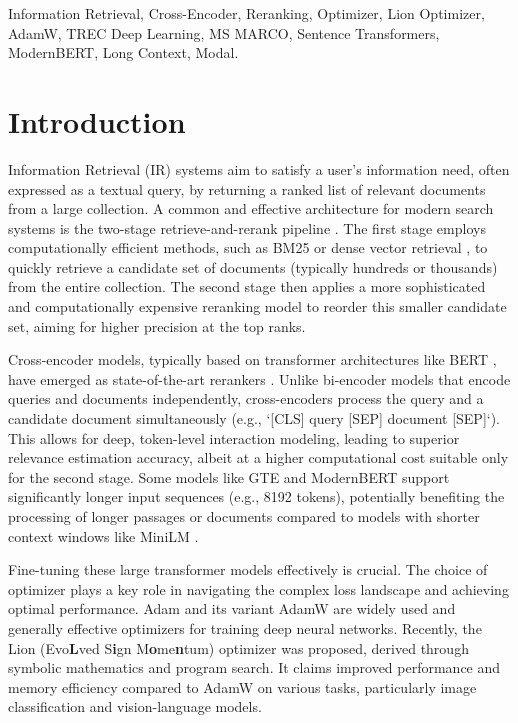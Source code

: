 \documentclass[conference]{IEEEtran}
\begin{document}
\begin{IEEEkeywords}
Information Retrieval, Cross-Encoder, Reranking, Optimizer, Lion Optimizer, AdamW, TREC Deep Learning, MS MARCO, Sentence Transformers, ModernBERT, Long Context, Modal.
\end{IEEEkeywords}

\section{Introduction}
Information Retrieval (IR) systems aim to satisfy a user's information need, often expressed as a textual query, by returning a ranked list of relevant documents from a large collection. A common and effective architecture for modern search systems is the two-stage retrieve-and-rerank pipeline \cite{hu2019retrievereadrerankendtoend}. The first stage employs computationally efficient methods, such as BM25 \cite{robertson2009probabilistic} or dense vector retrieval \cite{karpukhin2020dense}, to quickly retrieve a candidate set of documents (typically hundreds or thousands) from the entire collection. The second stage then applies a more sophisticated and computationally expensive reranking model to reorder this smaller candidate set, aiming for higher precision at the top ranks.

Cross-encoder models, typically based on transformer architectures like BERT \cite{devlin2019bert}, have emerged as state-of-the-art rerankers \cite{nogueira2020passagererankingbert, Nogueira2020Document}. Unlike bi-encoder models that encode queries and documents independently, cross-encoders process the query and a candidate document simultaneously (e.g., `[CLS] query [SEP] document [SEP]`). This allows for deep, token-level interaction modeling, leading to superior relevance estimation accuracy, albeit at a higher computational cost suitable only for the second stage. Some models like GTE \cite{li2023towards} and ModernBERT \cite{modernbert} support significantly longer input sequences (e.g., 8192 tokens), potentially benefiting the processing of longer passages or documents compared to models with shorter context windows like MiniLM \cite{wang2020minilm}.

Fine-tuning these large transformer models effectively is crucial. The choice of optimizer plays a key role in navigating the complex loss landscape and achieving optimal performance. Adam \cite{kingma2017adam} and its variant AdamW \cite{loshchilov2019decoupled} are widely used and generally effective optimizers for training deep neural networks. Recently, the Lion (Evo\textbf{L}ved S\textbf{i}gn M\textbf{o}me\textbf{n}tum) optimizer \cite{chen2023symbolic} was proposed, derived through symbolic mathematics and program search. It claims improved performance and memory efficiency compared to AdamW on various tasks, particularly image classification and vision-language models.
\end{document}
